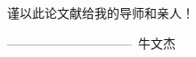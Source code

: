 
%
\newcommand{\fenleihao}{}%
\newcommand{\miji}{}%
\newcommand{\UDC}{}%
\newcommand{\oucctitle}{论文题目}%
\newcommand{\ouccauthor}{牛文杰}%
\newcommand{\oucdatedefense}{                }%
\newcommand{\oucgratitude}{谨以此论文献给我的导师和亲人！}%
\newcommand{\oucetitle}{English Title}%
\newcommand{\oucthesis}{\textsc{OUCThesis}}
\newcommand{\oucblankunderline}[1]{\rule[-2pt]{#1}{.7pt}}
\newcommand{\oucunderline}[2]{\underline{\hskip #1 #2 \hskip#1}}

\vspace*{5cm}
{\xiaoer\heiti\oucgratitude

\begin{flushright}
---\hspace*{-2mm}---\hspace*{-2mm}---\hspace*{-2mm}---\hspace*{-2mm}---\hspace*{-2mm}---\hspace*{-2mm}---\hspace*{-2mm}---\hspace*{-2mm}---\hspace*{-2mm}---~\ouccauthor
\end{flushright}
}

